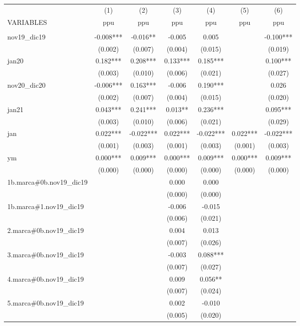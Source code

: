 \begin{tabular}{lcccccc} \hline
 & (1) & (2) & (3) & (4) & (5) & (6) \\
VARIABLES & ppu & ppu & ppu & ppu & ppu & ppu \\ \hline
 &  &  &  &  &  &  \\
nov19\_dic19 & -0.008*** & -0.016** & -0.005 & 0.005 &  & -0.100*** \\
 & (0.002) & (0.007) & (0.004) & (0.015) &  & (0.019) \\
jan20 & 0.182*** & 0.208*** & 0.133*** & 0.185*** &  & 0.100*** \\
 & (0.003) & (0.010) & (0.006) & (0.021) &  & (0.027) \\
nov20\_dic20 & -0.006*** & 0.163*** & -0.006 & 0.190*** &  & 0.026 \\
 & (0.002) & (0.007) & (0.004) & (0.015) &  & (0.020) \\
jan21 & 0.043*** & 0.241*** & 0.013** & 0.236*** &  & 0.095*** \\
 & (0.003) & (0.010) & (0.006) & (0.021) &  & (0.029) \\
jan & 0.022*** & -0.022*** & 0.022*** & -0.022*** & 0.022*** & -0.022*** \\
 & (0.001) & (0.003) & (0.001) & (0.003) & (0.001) & (0.003) \\
ym & 0.000*** & 0.009*** & 0.000*** & 0.009*** & 0.000*** & 0.009*** \\
 & (0.000) & (0.000) & (0.000) & (0.000) & (0.000) & (0.000) \\
1b.marca\#0b.nov19\_dic19 &  &  & 0.000 & 0.000 &  &  \\
 &  &  & (0.000) & (0.000) &  &  \\
1b.marca\#1.nov19\_dic19 &  &  & -0.006 & -0.015 &  &  \\
 &  &  & (0.006) & (0.021) &  &  \\
2.marca\#0b.nov19\_dic19 &  &  & 0.004 & 0.013 &  &  \\
 &  &  & (0.007) & (0.026) &  &  \\
3.marca\#0b.nov19\_dic19 &  &  & -0.003 & 0.088*** &  &  \\
 &  &  & (0.007) & (0.027) &  &  \\
4.marca\#0b.nov19\_dic19 &  &  & 0.009 & 0.056** &  &  \\
 &  &  & (0.007) & (0.024) &  &  \\
5.marca\#0b.nov19\_dic19 &  &  & 0.002 & -0.010 &  &  \\
 &  &  & (0.005) & (0.020) &  &  \\

\end{tabular}
